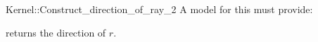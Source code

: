 \begin{ccRefFunctionObjectConcept}{Kernel::Construct_direction_of_ray_2}
A model for this must provide:


       {returns the direction of $r$.}


\end{ccRefFunctionObjectConcept}
